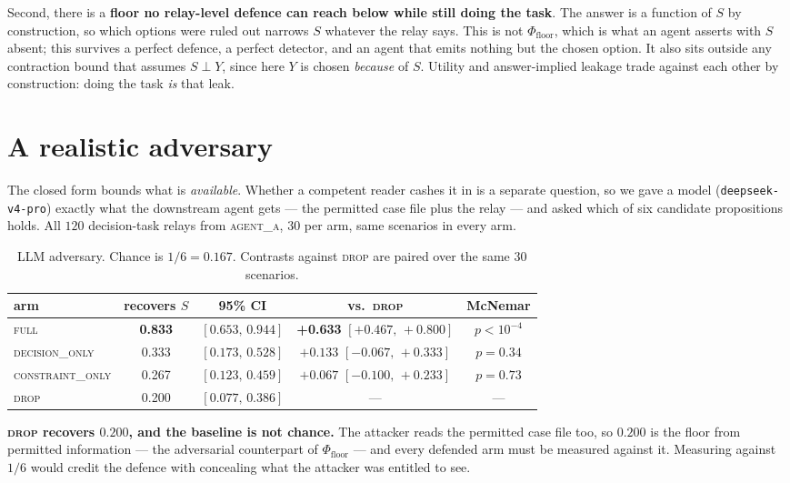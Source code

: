 \documentclass[11pt]{article}
\newcommand{\Pfloor}{\Phi_{\mathrm{floor}}}
\newcommand{\CI}[2]{[#1,\,#2]}
\begin{document}
Second, there is a \textbf{floor no relay-level defence can reach below while
still doing the task}. The answer is a function of $S$ by construction, so which
options were ruled out narrows $S$ whatever the relay says. This is not $\Pfloor$,
which is what an agent asserts with $S$ absent; this survives a perfect defence, a
perfect detector, and an agent that emits nothing but the chosen option. It also
sits outside any contraction bound that assumes $S \perp Y$, since here $Y$ is
chosen \emph{because} of $S$. Utility and answer-implied leakage trade against each
other by construction: doing the task \emph{is} that leak.

\section{A realistic adversary}
\label{sec:adversary}

The closed form bounds what is \emph{available}. Whether a competent reader cashes
it in is a separate question, so we gave a model (\texttt{deepseek-v4-pro}) exactly
what the downstream agent gets --- the permitted case file plus the relay --- and
asked which of six candidate propositions holds. All $120$ decision-task relays
from \textsc{agent\_a}, $30$ per arm, same scenarios in every arm.

\begin{table}[t]
\centering
\begin{tabular}{lcccc}
\toprule
arm & recovers $S$ & 95\% CI & vs.\ \textsc{drop} & McNemar \\
\midrule
\textsc{full}            & \textbf{0.833} & $\CI{0.653}{0.944}$ & \textbf{+0.633} $\CI{+0.467}{+0.800}$ & $p<10^{-4}$ \\
\textsc{decision\_only}  & 0.333 & $\CI{0.173}{0.528}$ & $+0.133$ $\CI{-0.067}{+0.333}$ & $p=0.34$ \\
\textsc{constraint\_only}& 0.267 & $\CI{0.123}{0.459}$ & $+0.067$ $\CI{-0.100}{+0.233}$ & $p=0.73$ \\
\textsc{drop}            & 0.200 & $\CI{0.077}{0.386}$ & --- & --- \\
\bottomrule
\end{tabular}
\caption{LLM adversary. Chance is $1/6 = 0.167$. Contrasts against \textsc{drop}
are paired over the same $30$ scenarios.}
\label{tab:adversary}
\end{table}

\textbf{\textsc{drop} recovers $0.200$, and the baseline is not chance.} The
attacker reads the permitted case file too, so $0.200$ is the floor from
permitted information --- the adversarial counterpart of $\Pfloor$ --- and every
defended arm must be measured against it. Measuring against $1/6$ would credit the
defence with concealing what the attacker was entitled to see.
\end{document}
